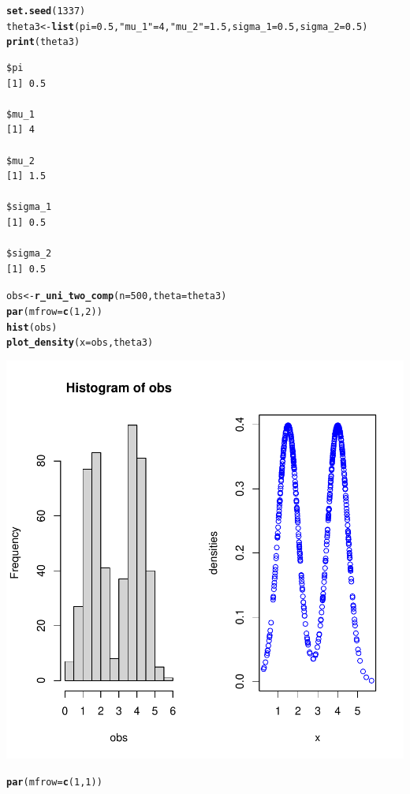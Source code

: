 \documentclass[10pt, a4paper, english]{article}\usepackage[]{graphicx}\usepackage[dvipsnames]{xcolor}
\makeatletter
\def\maxwidth{ %
  \ifdim\Gin@nat@width>\linewidth
    \linewidth
  \else
    \Gin@nat@width
  \fi
}
\newcommand{\hlnum}[1]{\textcolor[rgb]{0.686,0.059,0.569}{#1}}%
\newcommand{\hlstr}[1]{\textcolor[rgb]{0.192,0.494,0.8}{#1}}%
\newcommand{\hlstd}[1]{\textcolor[rgb]{0.345,0.345,0.345}{#1}}%
\newcommand{\hlkwb}[1]{\textcolor[rgb]{0.69,0.353,0.396}{#1}}%
\newcommand{\hlkwc}[1]{\textcolor[rgb]{0.333,0.667,0.333}{#1}}%
\newcommand{\hlkwd}[1]{\textcolor[rgb]{0.737,0.353,0.396}{\textbf{#1}}}%
\newenvironment{kframe}{%
 \def\at@end@of@kframe{}%
 \ifinner\ifhmode%
  \def\at@end@of@kframe{\end{minipage}}%
  \begin{minipage}{\columnwidth}%
 \fi\fi%
 \def\FrameCommand##1{\hskip\@totalleftmargin \hskip-\fboxsep
 \colorbox{shadecolor}{##1}\hskip-\fboxsep
     \hskip-\linewidth \hskip-\@totalleftmargin \hskip\columnwidth}%
 \MakeFramed {\advance\hsize-\width
   \@totalleftmargin\z@ \linewidth\hsize
   \@setminipage}}%
 {\par\unskip\endMakeFramed%
 \at@end@of@kframe}
\newenvironment{knitrout}{}{} %
\makeatother
\begin{document}
\begin{knitrout}
\color{fgcolor}\begin{kframe}
\begin{alltt}
\hlkwd{set.seed}\hlstd{(}\hlnum{1337}\hlstd{)}
\hlstd{theta3}\hlkwb{<-} \hlkwd{list}\hlstd{(}\hlkwc{pi}\hlstd{=}\hlnum{0.5}\hlstd{,} \hlstr{"mu_1"} \hlstd{=} \hlnum{4}\hlstd{,} \hlstr{"mu_2"} \hlstd{=} \hlnum{1.5}\hlstd{,} \hlkwc{sigma_1} \hlstd{=} \hlnum{0.5}\hlstd{,} \hlkwc{sigma_2} \hlstd{=} \hlnum{0.5}\hlstd{)}
\hlkwd{print}\hlstd{(theta3)}
\end{alltt}
\begin{verbatim}
$pi
[1] 0.5

$mu_1
[1] 4

$mu_2
[1] 1.5

$sigma_1
[1] 0.5

$sigma_2
[1] 0.5
\end{verbatim}
\begin{alltt}
\hlstd{obs} \hlkwb{<-} \hlkwd{r_uni_two_comp}\hlstd{(}\hlkwc{n}\hlstd{=}\hlnum{500}\hlstd{,}\hlkwc{theta}\hlstd{=theta3)}
\hlkwd{par}\hlstd{(}\hlkwc{mfrow}\hlstd{=}\hlkwd{c}\hlstd{(}\hlnum{1}\hlstd{,}\hlnum{2}\hlstd{))}
\hlkwd{hist}\hlstd{(obs)}
\hlkwd{plot_density}\hlstd{(}\hlkwc{x}\hlstd{=obs, theta3)}
\end{alltt}
\end{kframe}
\includegraphics[width=\maxwidth]{figure/unnamed-chunk-27-1} 
\begin{kframe}\begin{alltt}
\hlkwd{par}\hlstd{(}\hlkwc{mfrow}\hlstd{=}\hlkwd{c}\hlstd{(}\hlnum{1}\hlstd{,}\hlnum{1}\hlstd{))}
\end{alltt}
\end{kframe}
\end{knitrout}
\end{document}
